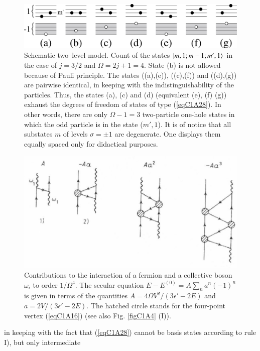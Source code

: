   \begin{figure}
 	\centerline {
 		\includegraphics*[width=13cm]{introduccion/figs/figalpha}
 	}
 	\caption{Schematic two--level model. Count of the states $|{m,1;m-1;m',1} \rangle$ in the case of $j=3/2$ and $\Omega=2j+1=4$. State (b) is not allowed because of Pauli principle. The states ((a),(e)), ((c),(f)) and ((d),(g)) are pairwise identical, in keeping with the indistinguishability of the particles. Thus, the states (a), (c) and (d) (equivalent (e), (f) (g)) exhaust the degrees of freedom of states of type (\ref{eqC1A28}). In other words, there are only $\Omega-1=3$ two-particle one-hole states in which the odd particle is in the state ($m',1$). It is of notice that all substates $m$ of levels $\sigma=\pm1$ are degenerate. One displays them equally spaced only for didactical purposes.}
 	\label{figalpha}
 \end{figure}
  \begin{figure}
  \centerline {
  \includegraphics*[width=12cm]{introduccion/figs/fig19}
  }
  \caption{Contributions to the interaction of a fermion and a collective boson $\omega_i$ to order $1/\Omega^4$. The secular equation $E-E^{(0)}=A\sum_na^n(-1)^n$ is given in terms of the quantities $A=4\Omega V^2/(3\epsilon'-2E)$ and $a=2V/(3\epsilon'-2E)$. The hatched circle stands for the four-point vertex (\ref{eqC1A16}) (see also Fig. \ref{figC1A4} (I)).}
  \label{figC1A2}
  \end{figure}
in keeping with the fact that (\ref{eqC1A28}) cannot be basis states according to rule I), but only intermediate
